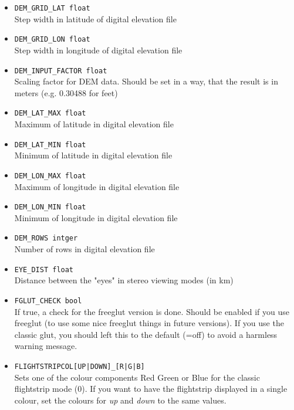 \begin{itemize}
\item \texttt{DEM\_GRID\_LAT float} \\
Step width in latitude of digital elevation file

\item \texttt{DEM\_GRID\_LON float} \\
Step width in longitude of digital elevation file

\item \texttt{DEM\_INPUT\_FACTOR float} \\
Scaling factor for DEM data. Should be set in a way, that the result is in meters (e.g. 0.30488 for feet)

\item \texttt{DEM\_LAT\_MAX float} \\
Maximum of latitude in digital elevation file

\item \texttt{DEM\_LAT\_MIN float} \\
Minimum of latitude in digital elevation file

\item \texttt{DEM\_LON\_MAX float} \\
Maximum of longitude in digital elevation file

\item \texttt{DEM\_LON\_MIN float} \\
Minimum of longitude in digital elevation file

\item \texttt{DEM\_ROWS intger} \\
Number of rows in digital elevation file

\item \texttt{EYE\_DIST float} \\
Distance between the "eyes" in stereo viewing modes (in km)

\item \texttt{FGLUT\_CHECK bool} \\
If true, a check for the freeglut version is done. Should be enabled if you use freeglut (to use
some nice freeglut things in future versions). If you use the classic glut, you should left this to
the default (=off) to avoid a harmless warning message.

\item \texttt{FLIGHTSTRIPCOL[UP|DOWN]\_[R|G|B]}\\
Sets one of the colour components Red Green or Blue for the classic flightstrip mode (0). If you want to have the flightstrip displayed in
a single colour, set the colours for \emph{up} and \emph{down} to the same values.


\end{itemize}
